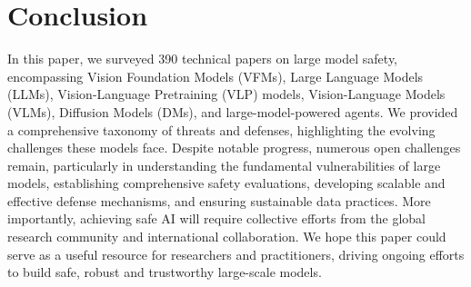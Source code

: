\section{Conclusion}\label{sec:conclusion}
In this paper, we surveyed 390 technical papers on large model safety, encompassing Vision Foundation Models (VFMs), Large Language Models (LLMs), Vision-Language Pretraining (VLP) models, Vision-Language Models (VLMs), Diffusion Models (DMs), and large-model-powered agents. We provided a comprehensive taxonomy of threats and defenses, highlighting the evolving challenges these models face. 
Despite notable progress, numerous open challenges remain, particularly in understanding the fundamental vulnerabilities of large models, establishing comprehensive safety evaluations, developing scalable and effective defense mechanisms, and ensuring sustainable data practices. More importantly, achieving safe AI will require collective efforts from the global research community and international collaboration.
We hope this paper could serve as a useful resource for researchers and practitioners, driving ongoing efforts to build safe, robust and trustworthy large-scale models.

